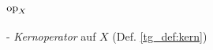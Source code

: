     \paragraph{$\text{op}_X$} - \quad \textit{Kernoperator} auf $X$ (Def. \ref{tg_def:kern})




% 
%         
%         
%         
%         
%         
%     
% 
%         


%         
%         
% 
% 
% 
% 
%         



